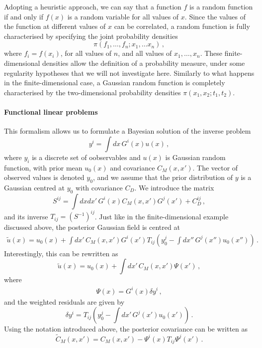 Adopting a heuristic approach, we can say that a function $f$ is a random
function if and only if $f(x)$ is a random variable for all values of $x$. Since
the values of the function at different values of $x$ can be correlated, a
random function is fully characterised by specifying the joint probability
densities
\begin{equation}
  \label{eq:RandomFuncJointProb}
  \pi\left(
    f_1, \ldots, f_n; x_1, \ldots x_n
  \right)\, ,
\end{equation}
where $f_i=f(x_i)$, for all values of $n$, and all values of $x_1, \ldots, x_n$.
These finite-dimensional densities allow the definition of a probability
measure, under some regularity hypotheses that we will not investigate here.
Similarly to what happens in the finite-dimensional case, a Gaussian random
function is completely characterised by the two-dimensional probability
densities $\pi(x_1,x_2;t_1,t_2)$.

\paragraph{Functional linear problems} This formalism allows us to formulate a Bayesian solution of the inverse problem 
\begin{equation}
  \label{eq:BayesLinearInverse}
  y^i = \int dx\, G^i(x) u(x)\, ,
\end{equation}
where $y_i$ is a discrete set of oobservables and $u(x)$ is Gaussian random
function, with prior mean $u_0(x)$ and covariance $C_M(x,x')$. The vector of
observed values is denoted $y_0$, and we assume that the prior distribution of
$y$ is a Gaussian centred at $y_0$ with covariance $C_D$. We introduce the
matrix
\begin{equation}
  \label{eq:Smatrix}
  S^{ij} =
  \int dx dx'\, G^i(x) C_M(x,x') G^j(x') + C_D^{ij}\, ,
\end{equation}
and its inverse $T_{ij}=\left(S^{-1}\right)^{ij}$. Just like in the finite-dimensional example discussed above, the posterior Gaussian field is centred at
\begin{align}
  \label{eq:PostMeanFunc}
  \tilde{u}(x) = u_0(x) + 
  \int dx'\, C_M(x,x') G^i(x') T_{ij} \left(
    y_0^j - \int dx''\, G^j(x'') u_0(x'') 
  \right)\, .
\end{align}
Interestingly, this can be rewritten as
\begin{equation}
  \label{eq:TowardsBackus}
  \tilde{u}(x) = u_0(x) + 
  \int dx'\, C_M(x,x') \Psi(x')\, ,
\end{equation}
where 
\begin{eqnarray}
  \label{eq:PsiDef}
  \Psi(x) = G^i(x) \delta y^i\, ,
\end{eqnarray}
and the weighted residuals are given by
\begin{equation}
  \label{eq:DeltaYDef}
  \delta y^i = T_{ij} \left(
  y_0^j - \int dx'\, G^j(x') u_0(x')
  \right)\, .
\end{equation}
Using the notation introduced above, the posterior covariance can be written as
\begin{equation}
  \label{eq:PostCovFunc}
  \tilde{C}_M(x,x') = 
  C_M(x,x') - \Psi^i(x) T_{ij} \Psi^j(x')\, .
\end{equation}

